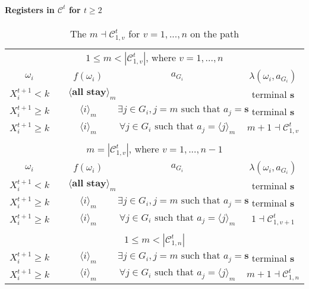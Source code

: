 \documentclass[12pt,letter]{article}
\newcommand{\Kappa}{\mathcal{C}}
\theoremstyle{definition}
\theoremstyle{remark}
\theoremstyle{claim}
\begin{document}
\clearpage

\paragraph{Registers in $\Kappa^t$ for $t\geq 2$}
\clearpage
\begin{table}[!htbp]
\caption{The $m\dashv\Kappa^t_{1,v}$ for $v=1,...,n$ on the path}
\label{table:eqm_path_kt1}
\begin{center}
\begin{tabular}{c c | c | c | c}
\multicolumn{5}{c}{$1\leq m < |\Kappa^t_{1,v}|$, where $v=1,...,n$}\\
$\omega_i$ 	 & 	   &	$f(\omega_i)$  &	$a_{G_i}$ & $\lambda(\omega_i,a_{G_i})$ \\
\hline
\hline
$X^{t+1}_i<k$  	&                                & $\langle \textbf{all stay} \rangle_m$		&				 				& terminal \textbf{s}\\
$X^{t+1}_i\geq k$  	& 						& $\langle i \rangle_m$		&  $\exists j\in G_i, j=m\text{ such that } a_j=\textbf{s}$	& terminal \textbf{s}\\
$X^{t+1}_i\geq k$ 	& 						& $\langle i \rangle_m$		&  $\forall j\in G_i\text{ such that } a_j= \langle j \rangle_m$	& $m+1\dashv \Kappa^t_{1,v}$\\
\hline
\\
\multicolumn{5}{c}{$m= |\Kappa^t_{1,v}|$, where $v=1,...,n-1$}\\
$\omega_i$ 	 & 	   &	$f(\omega_i)$  &	$a_{G_i}$ & $\lambda(\omega_i,a_{G_i})$ \\
\hline
\hline
$X^{t+1}_i<k$  	&                                & $\langle \textbf{all stay} \rangle_m$	&				 				& terminal \textbf{s}\\
$X^{t+1}_i\geq k$ & 						& $\langle i \rangle_m$		&  $\exists j\in G_i, j=m\text{ such that } a_j=\textbf{s}$	& terminal \textbf{s}\\
$X^{t+1}_i\geq k$ 	& 						& $\langle i \rangle_m$		&  $\forall j\in G_i\text{ such that } a_j= \langle j \rangle_m$	& $1\dashv \Kappa^t_{1,v+1}$\\
\hline
\\
\multicolumn{5}{c}{$1\leq m < |\Kappa^t_{1,n}|$}\\
\hline
\hline
$X^{t+1}_i\geq k$ 	& 						& $\langle i \rangle_m$		&  $\exists j\in G_i, j=m\text{ such that } a_j=\textbf{s}$	& terminal \textbf{s}\\
$X^{t+1}_i\geq k$ & 						& $\langle i \rangle_m$		&  $\forall j\in G_i\text{ such that } a_j= \langle j \rangle_m$	& $m+1\dashv \Kappa^t_{1,n}$\\

\end{tabular}
\end{center}
\end{table}
\end{document}
